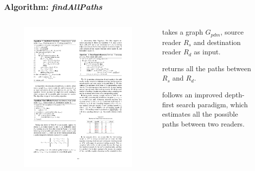 
\begin{frame}
\frametitle{Algorithm: \emph{findAllPaths}}

\begin{columns}

  \begin{figure}[tb]
    \includegraphics[width=\columnwidth]{figures/3-3/3-3-9.pdf}
  \end{figure}

  \begin{sitemize}
    \item takes a graph $G_{pdm}$, source reader $R_s$ and destination reader $R_d$ as input.
    \item returns all the paths between $R_s$ and $R_d$.
    \item follows an improved depth-first search paradigm, which estimates all the possible paths between two readers.
  \end{sitemize}

\end{columns}

\end{frame}

